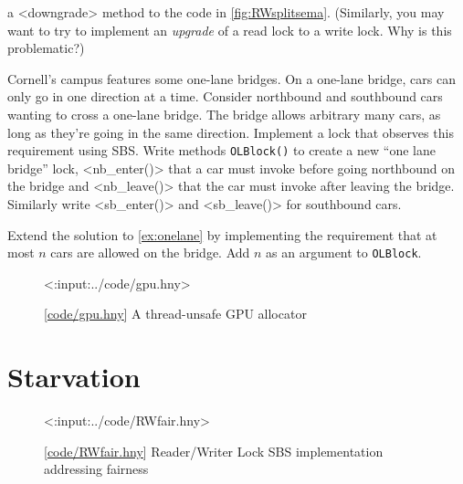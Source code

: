 \documentclass{report}
\newcommand{\harmonylink}[1]{%
[\href{https://harmony.cs.cornell.edu/#1}{\underline{#1}}]%
}
\newenvironment{code}{
\tcolorbox
}{
\endtcolorbox
}
\begin{document}
\begin{problems}
a <{downgrade}> method to the code in \autoref{fig:RWsplitsema}.
(Similarly, you may want to try to implement an \emph{upgrade} of a
read lock to a write lock.  Why is this problematic?)
\item \label{ex:onelane} Cornell's campus features some one-lane bridges.
On a one-lane bridge,
cars can only go in one direction at a time. Consider northbound
and southbound cars wanting to cross a one-lane bridge.
The bridge allows arbitrary many cars, as long as they're going in the
same direction.
Implement a lock that observes this requirement using SBS.
Write methods \texttt{OLBlock()} to create a new ``one lane bridge'' lock,
<{nb_enter()}> that a car must invoke before going northbound on
the bridge and <{nb_leave()}> that the car must invoke after leaving
the bridge.  Similarly write <{sb_enter()}> and <{sb_leave()}>
for southbound cars.
\item Extend the solution to \autoref{ex:onelane} by implementing the
requirement that at most $n$ cars are allowed on the bridge.  Add $n$
as an argument to \texttt{OLBlock}.

\end{problems}

\begin{figure}
\begin{code}
<{:input:../code/gpu.hny}>
\end{code}
\caption{\harmonylink{code/gpu.hny} A thread-unsafe GPU allocator}
\label{fig:gpu}
\end{figure}

\chapter{Starvation}
\label{ch:starvation}
%

%

\begin{figure}
\begin{code}
{\small
<{:input:../code/RWfair.hny}>
}
\end{code}
\caption{\harmonylink{code/RWfair.hny} Reader/Writer Lock SBS implementation addressing fairness}
\label{fig:RWfair}
\end{figure}

%
\end{document}
